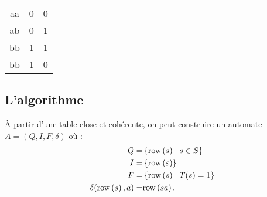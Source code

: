 \begin{exemple}
\begin{itemize}
\begin{center}
\begin{tabular}{c|c|c}
				      aa         & 0          & 0 \\
				      ab         & 0          & 1 \\
				      bb         & 1          & 1 \\
				      bb         & 1          & 0 \\
			      \end{tabular}
		      \end{center}
	\end{itemize}
\end{exemple}


\subsection{L'algorithme}

\begin{theorem}\label{thm:automata-tables}
	À partir d'une table close et cohérente, on peut construire un automate $A = (Q, I, F, \delta)$ où :
	$$
		\begin{aligned}
			Q                   = & \left\{ \text{row}\left(s\right) \mid s \in S \right\}  \\
			I                   = & \left\{ \text{row}\left(\varepsilon\right) \right\}        \\
			F                   = & \left\{ \text{row}\left(s\right)  \mid T(s) = 1 \right\} \\
			\delta(\text{row}\left(s\right), a)  = & \text{row}\left(sa\right).
		\end{aligned}
	$$
\end{theorem}

